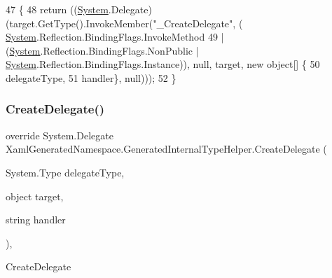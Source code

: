 \begin{DoxyCode}
47                                                                                                            
              \{
48             \textcolor{keywordflow}{return} ((\hyperlink{namespaceSystem}{System}.Delegate)(target.GetType().InvokeMember(\textcolor{stringliteral}{"\_CreateDelegate"}, (
      \hyperlink{namespaceSystem}{System}.Reflection.BindingFlags.InvokeMethod 
49                             | (\hyperlink{namespaceSystem}{System}.Reflection.BindingFlags.NonPublic | 
      \hyperlink{namespaceSystem}{System}.Reflection.BindingFlags.Instance)), null, target, \textcolor{keyword}{new} \textcolor{keywordtype}{object}[] \{
50                         delegateType,
51                         handler\}, null)));
52         \}
\end{DoxyCode}
\mbox{\label{classXamlGeneratedNamespace_1_1GeneratedInternalTypeHelper_a8ec4c37e82d9f4e867e9655f4eac3a78}} 
\subsubsection{\texorpdfstring{Create\+Delegate()}{CreateDelegate()}\hspace{0.1cm}{\footnotesize\ttfamily [2/3]}}
{\footnotesize\ttfamily override System.\+Delegate Xaml\+Generated\+Namespace.\+Generated\+Internal\+Type\+Helper.\+Create\+Delegate (\begin{DoxyParamCaption}\item[{System.\+Type}]{delegate\+Type,  }\item[{object}]{target,  }\item[{string}]{handler }\end{DoxyParamCaption})\hspace{0.3cm}{\ttfamily [inline]}, {\ttfamily [protected]}}



Create\+Delegate 


